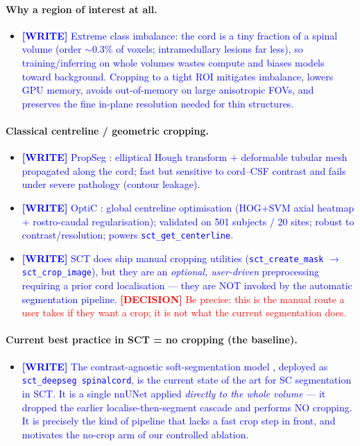 \documentclass[11pt]{article}
\newcommand{\WRITE}[1]{\textcolor{blue}{\textbf{[WRITE]} #1}}
\newcommand{\DECISION}[1]{\textcolor{red}{\textbf{[DECISION]} #1}}
\begin{document}
\paragraph{Why a region of interest at all.}
\begin{itemize}
  \item \WRITE{Extreme class imbalance: the cord is a tiny fraction of a spinal
        volume (order $\sim$0.3\% of voxels; intramedullary lesions far less),
        so training/inferring on whole volumes wastes compute and biases models
        toward background. Cropping to a tight ROI mitigates imbalance, lowers
        GPU memory, avoids out-of-memory on large anisotropic FOVs, and
        preserves the fine in-plane resolution needed for thin structures.}
\end{itemize}

\paragraph{Classical centreline / geometric cropping.}
\begin{itemize}
  \item \WRITE{PropSeg \cite{deleener2014propseg}: elliptical Hough transform +
        deformable tubular mesh propagated along the cord; fast but sensitive to
        cord--CSF contrast and fails under severe pathology (contour leakage).}
  \item \WRITE{OptiC \cite{gros2017optic}: global centreline optimisation
        (HOG+SVM axial heatmap + rostro-caudal regularisation); validated on 501
        subjects / 20 sites; robust to contrast/resolution; powers
        \texttt{sct\_get\_centerline}.}
  \item \WRITE{SCT does ship manual cropping utilities
        (\texttt{sct\_create\_mask} $\to$ \texttt{sct\_crop\_image}), but they
        are an \emph{optional, user-driven} preprocessing requiring a prior cord
        localisation --- they are NOT invoked by the automatic segmentation
        pipeline. \DECISION{Be precise: this is the manual route a user takes if
        they want a crop; it is not what the current segmentation does.}}
\end{itemize}

\paragraph{Current best practice in SCT = no cropping (the baseline).}
\begin{itemize}
  \item \WRITE{The contrast-agnostic soft-segmentation model
        \cite{bedard2025media, karthik2026imag}, deployed as
        \texttt{sct\_deepseg spinalcord}, is the current state of the art for SC
        segmentation in SCT. It is a single nnUNet \cite{isensee2021nnunet}
        applied \emph{directly to the whole volume} --- it dropped the earlier
        localise-then-segment cascade and performs NO cropping. It is precisely
        the kind of pipeline that lacks a fast crop step in front, and motivates
        the no-crop arm of our controlled ablation.}
\end{itemize}
\end{document}
